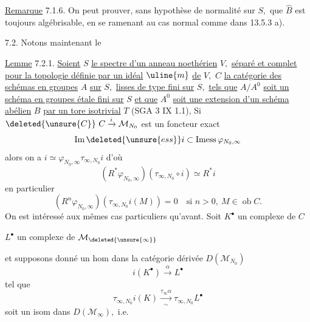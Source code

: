 \uline{Remarque} 7.1.6. On peut prouver, sans hypothèse de normalité sur \(S,\) que \(\hat B\) est toujours algébrisable, en se ramenant au cas normal comme dans 13.5.3 a).

7.2. Notons maintenant le

\uline{Lemme} 7.2.1. \uline{Soient} \(S\) \uline{le spectre d'un anneau noethérien} \(V,\) \uline{séparé et complet pour la topologie définie par un idéal} \(\uline{m}\) \uline{de} \(V,\) \(C\) \uline{la catégorie des schémas en groupes} \(A\) \uline{sur} \(S,\) \uline{lisses de type fini sur} \(S,\) \uline{tels que} \(A/A^0\) \uline{soit un schéma en groupes étale fini sur} \(S\) \uline{et que} \(A^0\) \uline{soit une extension d'un schéma abélien} \(B\) \uline{par un tore isotrivial} \(T\) (SGA 3 IX 1.1),
Si \(\deleted{\unsure{C}}\ C\xrightarrow{i}\mathcal M_{N_0}\) est un foncteur exact
\[
\operatorname{Im}\deleted{\unsure{ess}}i\subset\operatorname{Imess}\varphi_{N_0,\infty}
\]
alors on a \(i\simeq\varphi_{N_0,\infty}\tau_{\infty,N_0}i\) d'où
\[
(R^*\varphi_{N_0,\infty})(\tau_{\infty,N_0}\circ i)\simeq R^*i
\]
en particulier
\[
(R^n\varphi_{N_0,\infty})(\tau_{\infty,N_0}i(M))=0\quad\text{si }n>0,\ M\in\operatorname{ob}C.
\]
On est intéressé aux mêmes cas particuliers qu'avant.
Soit \(K^\bullet\) un complexe de \(C\)

\(L^\bullet\) un complexe de \(\mathcal M_{\deleted{\unsure{\infty}}}\)

et supposons donné un hom dans la catégorie dérivée \(D(\mathcal M_{N_0})\)
\[
i(K^\bullet)\xrightarrow{\alpha}L^\bullet
\]
tel que
\[
\tau_{\infty,N_0}i(K)\xrightarrow[\sim]{\tau_\infty\alpha}\tau_{\infty,N_0}L^\bullet
\]
soit un isom dans \(D(\mathcal M_\infty),\) i.e.

